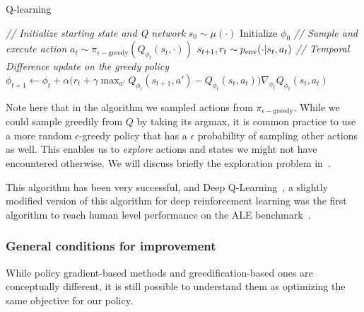 \begin{center}
\begin{minipage}{0.9\textwidth}
\begin{algorithm}[H]
\caption{Q-learning}
\label{alg:q_learning}
\begin{algorithmic}[1]
\STATE \textit{// Initialize starting state and Q network}
\STATE $s_0 \sim \mu(\cdot)$
\STATE Initialize $\phi_0$
\STATE \textit{// Sample and execute action}
\STATE $a_t \sim \pi_{\epsilon-\text{greedy}}( Q_{\phi_t}(s_t, \cdot))$
\STATE $s_{t+1}, r_t \sim p_{\text{env}}(\cdot | s_t, a_t)$
\STATE \textit{// Temporal Difference update on the greedy policy}
\STATE $\phi_{t+1} \leftarrow {\phi_t} + \alpha \big( r_t + \gamma \max_{a'} Q_{\phi_t}(s_{t+1}, a') - Q_{\phi_t}(s_t, a_t) \big) \nabla_{\phi_t} Q_{\phi_t}(s_t, a_t) $
\ENDFOR

\end{algorithmic}
\end{algorithm}
\end{minipage}
\end{center}
Note here that in the algorithm we sampled actions from $\pi_{\epsilon-\text{greedy}}$. While we could sample greedily from $Q$ by taking its argmax, it is common practice to use a more random $\epsilon$-greedy policy that has a $\epsilon$ probability of sampling other actions as well. This enables us to \emph{explore} actions and states we might not have encountered otherwise. We will discuss briefly the exploration problem in~.

This algorithm has been very successful, and Deep Q-Learning~\citep{mnih2013playing}, a slightly modified version of this algorithm for deep reinforcement learning was the first algorithm to reach human level performance on the ALE benchmark~\citep{bellemare2013arcade}.


\subsubsection{General conditions for improvement} 
While policy gradient-based methods and greedification-based ones are conceptually different, it is still possible to understand them as optimizing the same objective for our policy.

